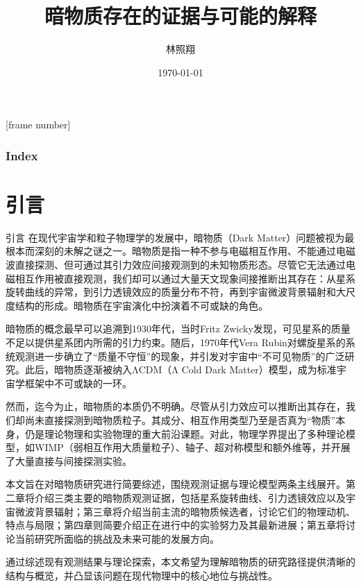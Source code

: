 \documentclass{beamer} %
\title{暗物质存在的证据与可能的解释 } %
\author{林照翔  } %
\date{\today} %
\begin{document}
\songti %
\everymath{\displaystyle}
[frame number]


\begin{frame}
    \titlepage %
\end{frame}

\begin{frame}
    \frametitle{\textbf{Index}}
    \begin{multicols}{2}
    \tableofcontents
    \end{multicols}
\end{frame}

\section{引言}

\begin{frame}{引言}
在现代宇宙学和粒子物理学的发展中，暗物质（Dark Matter）问题被视为最根本而深刻的未解之谜之一。暗物质是指一种不参与电磁相互作用、不能通过电磁波直接探测、但可通过其引力效应间接观测到的未知物质形态。尽管它无法通过电磁相互作用被直接观测，我们却可以通过大量天文现象间接推断出其存在：从星系旋转曲线的异常，到引力透镜效应的质量分布不符，再到宇宙微波背景辐射和大尺度结构的形成。暗物质在宇宙演化中扮演着不可或缺的角色。

暗物质的概念最早可以追溯到1930年代，当时Fritz Zwicky发现，可见星系的质量不足以提供星系团内所需的引力约束。随后，1970年代Vera Rubin对螺旋星系的系统观测进一步确立了“质量不守恒”的现象，并引发对宇宙中“不可见物质”的广泛研究。此后，暗物质逐渐被纳入ΛCDM（Λ Cold Dark Matter）模型，成为标准宇宙学框架中不可或缺的一环。
\end{frame}

\begin{frame}
然而，迄今为止，暗物质的本质仍不明确。尽管从引力效应可以推断出其存在，我们却尚未直接探测到暗物质粒子。其成分、相互作用类型乃至是否真为“物质”本身，仍是理论物理和实验物理的重大前沿课题。对此，物理学界提出了多种理论模型，如WIMP（弱相互作用大质量粒子）、轴子、超对称模型和额外维等，并开展了大量直接与间接探测实验。

本文旨在对暗物质研究进行简要综述，围绕观测证据与理论模型两条主线展开。第二章将介绍三类主要的暗物质观测证据，包括星系旋转曲线、引力透镜效应以及宇宙微波背景辐射；第三章将介绍当前主流的暗物质候选者，讨论它们的物理动机、特点与局限；第四章则简要介绍正在进行中的实验努力及其最新进展；第五章将讨论当前研究所面临的挑战及未来可能的发展方向。

通过综述现有观测结果与理论探索，本文希望为理解暗物质的研究路径提供清晰的结构与概览，并凸显该问题在现代物理中的核心地位与挑战性。
\end{frame}
\end{document}
